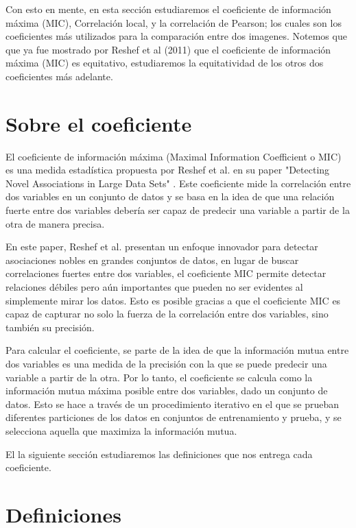 Con esto en mente, en esta secci\'on estudiaremos el coeficiente de informaci\'on m\'axima (MIC), Correlaci\'on local, y la correlaci\'on de Pearson; los cuales son los coeficientes m\'as utilizados para la comparaci\'on entre dos imagenes. Notemos que que ya fue mostrado por Reshef et al (2011) \cite{Reshef2011} que el coeficiente de informaci\'on m\'axima (MIC) es equitativo, estudiaremos la equitatividad de los otros dos coeficientes m\'as adelante.


\section{Sobre el coeficiente}

	El coeficiente de informaci\'on m\'axima (Maximal Information Coefficient o MIC) es una medida estad\'istica propuesta por Reshef et al. en su paper "Detecting Novel Associations in Large Data Sets" \cite{Reshef2011}. Este coeficiente mide la correlaci\'on entre dos variables en un conjunto de datos y se basa en la idea de que una relaci\'on fuerte entre dos variables deber\'ia ser capaz de predecir una variable a partir de la otra de manera precisa.

	En este paper, Reshef et al. presentan un enfoque innovador para detectar asociaciones nobles en grandes conjuntos de datos, en lugar de buscar correlaciones fuertes entre dos variables, el coeficiente MIC permite detectar relaciones d\'ebiles pero a\'un importantes que pueden no ser evidentes al simplemente mirar los datos. Esto es posible gracias a que el coeficiente MIC es capaz de capturar no solo la fuerza de la correlaci\'on entre dos variables, sino tambi\'en su precisi\'on.

	Para calcular el coeficiente, se parte de la idea de que la informaci\'on mutua entre dos variables es una medida de la precisi\'on con la que se puede predecir una variable a partir de la otra. Por lo tanto, el coeficiente se calcula como la informaci\'on mutua m\'axima posible entre dos variables, dado un conjunto de datos. Esto se hace a trav\'es de un procedimiento iterativo en el que se prueban diferentes particiones de los datos en conjuntos de entrenamiento y prueba, y se selecciona aquella que maximiza la informaci\'on mutua.

	El la siguiente secci\'on estudiaremos las definiciones que nos entrega cada coeficiente.
 
\section{Definiciones}

